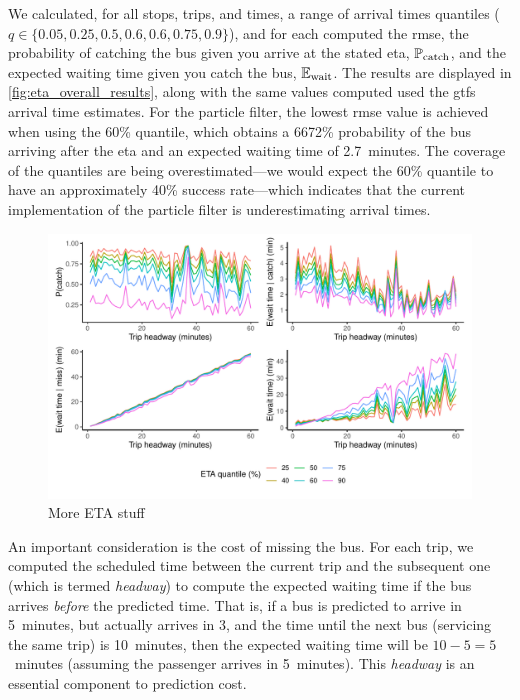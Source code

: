 We calculated, for all stops, trips, and times, a range of arrival times quantiles ($q \in \{0.05, 0.25, 0.5, 0.6, 0.6, 0.75, 0.9\}$), and for each computed the \gls{rmse}, the probability of catching the bus given you arrive at the stated \gls{eta}, $\mathbb{P}_\text{catch}$, and the expected waiting time given you catch the bus, $\mathbb{E}_\text{wait}$. The results are displayed in \cref{fig:eta_overall_results}, along with the same values computed used the \gls{gtfs} arrival time estimates. For the particle filter, the lowest \gls{rmse} value is achieved when using the 60\% quantile, which obtains a 6672\% probability of the bus arriving after the \gls{eta} and an expected waiting time of 2.7~minutes. The coverage of the quantiles are being overestimated---we would expect the 60\% quantile to have an approximately 40\% success rate---which indicates that the current implementation of the particle filter is underestimating arrival times.


\begin{knitrout}\small
{}\color{fgcolor}\begin{figure}

{\centering \includegraphics[width=\textwidth]{figure/eta_headway_results-1} 

}

\caption[More ETA stuff]{More ETA stuff}\label{fig:eta_headway_results}
\end{figure}


\end{knitrout}

An important consideration is the cost of missing the bus. For each trip, we computed the scheduled time between the current trip and the subsequent one (which is termed \emph{headway}) to compute the expected waiting time if the bus arrives \emph{before} the predicted time. That is, if a bus is predicted to arrive in 5~minutes, but actually arrives in 3, and the time until the next bus (servicing the same trip) is 10~minutes, then the expected waiting time will be $10-5=5$~minutes (assuming the passenger arrives in 5~minutes). This \emph{headway} is an essential component to prediction cost.

